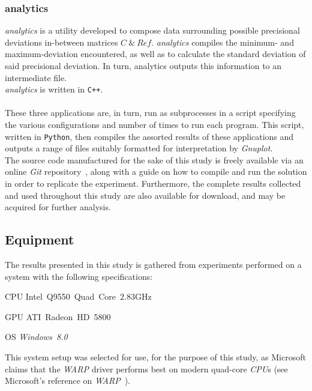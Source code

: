 \subsubsection{analytics}
\textit{analytics} is a utility developed to compose data surrounding possible precisional deviations in-between matrices $C~\&~Ref$.
\textit{analytics} compiles the minimum- and maximum-deviation encountered, as well as to calculate the standard deviation of said precisional deviation.
In turn, analytics outputs this information to an intermediate file.\\
\textit{analytics} is written in \texttt{C++}.\\
\\
These three applications are, in turn, run as subprocesses in a script specifying the various configurations and number of times to run each program.
This script, written in \texttt{Python}, then compiles the assorted results of these applications and outputs a range of files suitably formatted for interpretation by \textit{Gnuplot}.\\
The source code manufactured for the sake of this study is freely available via an online \textit{Git} repository~, along with a guide on how to compile and run the solution in order to replicate the experiment.
Furthermore, the complete results collected and used throughout this study are also available for download, and may be acquired for further analysis.

\subsection{Equipment}
\label{sec:contribution:equipment}
The results presented in this study is gathered from experiments performed on a system with the following specifications:
\begin{description*}
	\item[CPU]	Intel~Q9550~Quad~Core~$2.83$GHz
	\item[GPU]	ATI~Radeon~HD~5800
	\item[OS]	\tabto{0.35cm}\textit{Windows~8.0} %
\end{description*}
This system setup was selected for use, for the purpose of this study, as Microsoft claims that the \textit{WARP} driver performs best on modern quad-core \textit{CPU}s (see Microsoft's reference on \textit{WARP}~).


